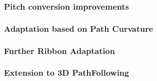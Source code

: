 \subsubsection{Pitch conversion improvements}

\subsubsection{Adaptation based on Path Curvature}

\subsubsection{Further Ribbon Adaptation}


\subsubsection{Extension to 3D PathFollowing}





